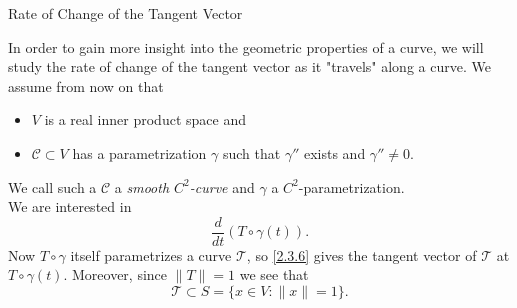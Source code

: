\documentclass[smaller,hyperref={CJKbookmarks=true}]{beamer}
\begin{document}
\begin{frame}[t]{Rate of Change of the Tangent Vector}
\begin{spacing}{1.2}
In order to gain more insight into the geometric properties of a curve, we
will study the rate of change of the tangent vector as it "travels" along a
curve. We assume from now on that
\begin{itemize}
  \item $V$ is a real inner product space and
  \item $\mathcal{C}\subset V$ has a parametrization $\gamma$ such that $\gamma''$ exists and $\gamma''\neq0$.
\end{itemize}
We call such a $\mathcal{C}$ a \emph{smooth $C^2$-curve} and $\gamma$ a $C^2$-parametrization.\\[5pt]
We are interested in
\begin{equation}\label{2.3.6}
  \frac{d}{dt}\left(T\circ\gamma(t)\right).
\end{equation}
Now $T\circ\gamma$ itself parametrizes a curve $\mathcal{T}$, so \eqref{2.3.6} gives the tangent vector of $\mathcal{T}$ at $T\circ\gamma(t)$. Moreover, since $\|T\|=1$ we see that
\[\mathcal{T}\subset S=\{x\in V:\|x\|=1\}.\]
\end{spacing}
\end{frame}
\end{document}
